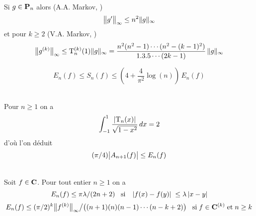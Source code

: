 \smallskip{} \\
Si  $g \in {\bf P}_n$ alors (A.A. Markov, \cite[page 91]{fCh})    
\begin{equation} \label{fF 5.2.1}
\big\lVert  g'  \big\rVert_{\infty} \leq n^2 \lVert  g  \rVert_{\infty}
\end{equation}
et pour  $k \geq 2$ (V.A. Markov, \cite[Theorem 2.24]{fRi})   
\begin{equation} \label{fF 5.2.2}
\big\lVert  g^{(k)}  \big\rVert_{\infty} \leq {\rm T}_n^{(k)}(1) \lVert  g 
 \rVert_{\infty} = \frac {n^2(n^2-1)\cdots(n^2-(k-1)^2)} {1.3.5\cdots(2k-1)} 
\,\lVert  g  \rVert_{\infty}
\end{equation}


\smallskip{}
\begin{equation} \label{fF 5.2.3}
E_n(f) \leq S_n(f) \leq \left(4+ \frac {4} {\pi^{2}} \log (n)\right)\,E_n(f)
\end{equation}

\smallskip{}\\
Pour  $n \geq  1$  on a	
\[
\int_{-1}^{1} \frac {\left|{ {\rm T}_n(x) }\right|} {\sqrt {1-x^2}}\,dx = 2
\]
d'où l'on déduit   
\begin{equation} \label{fF 5.2.4}
(\pi /4) \big|{A_{n+1}(f)}\big|   \leq E_n(f)
\end{equation}

\smallskip{}\\
Soit $f \in {\bf C}$. Pour tout entier $n \geq 1$ on a 
\begin{equation} \label{fF 5.2.5}
E_n(f) \leq \pi \lambda /(2n+2) \; \; \; \hbox{si} \; \; \; \left|{f(x)-f(y)}\right|\;  \leq \lambda \left|{x-y}\right|
\end{equation}
\begin{equation} \label{fF 5.2.6}
E_n(f) \leq (\pi /2)^k \big\lVert  f^{(k)}  \big\rVert_{\infty} \big/ \big((n+1)(n)(n-
1)\cdots(n-k+2)\big) \; \;\; \hbox{si} \; f \in {\bf C}^{(k)} \; \hbox{et} \; n\geq k
\end{equation}

